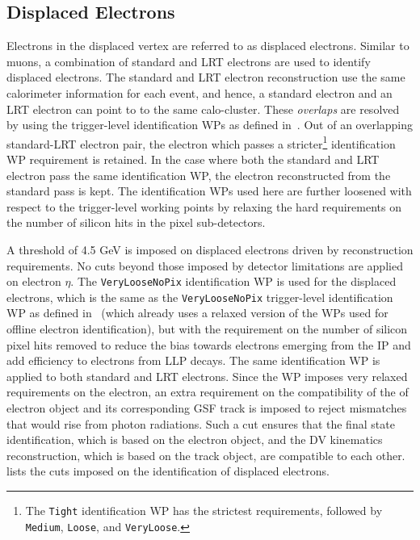 \subsection{Displaced Electrons}
Electrons in the displaced vertex are referred to as displaced electrons. Similar to muons, a combination of standard and LRT electrons are used to identify displaced electrons. The standard and LRT electron reconstruction use the same calorimeter information for each event, and hence, a standard electron and an LRT electron can point to to the same calo-cluster. These \textit{overlaps} are resolved by using the trigger-level identification WPs as defined in~\cite{PERF-2017-01}. Out of an overlapping standard-LRT electron pair, the electron which passes a stricter\footnote{The \texttt{Tight} identification WP has the strictest requirements, followed by \texttt{Medium}, \texttt{Loose}, and \texttt{VeryLoose}.} identification WP requirement is retained. In the case where both the standard and LRT electron pass the same identification WP, the electron reconstructed from the standard pass is kept. The identification WPs used here are further loosened with respect to the trigger-level working points by relaxing the hard requirements on the number of silicon hits in the pixel sub-detectors. 

A \pT threshold of 4.5 GeV is imposed on displaced electrons driven by reconstruction requirements. No cuts beyond those imposed by detector limitations are applied on electron $\eta$. The \texttt{VeryLooseNoPix} identification WP is used for the displaced electrons, which is the same as the \texttt{VeryLooseNoPix} trigger-level identification WP as defined in~\cite{PERF-2017-01} (which already uses a relaxed version of the WPs used for offline electron identification), but with the requirement on the number of silicon pixel hits removed to reduce the bias towards electrons emerging from the IP and add efficiency to electrons from LLP decays. The same identification WP is applied to both standard and LRT electrons. Since the WP imposes very relaxed requirements on the electron, an extra requirement on the compatibility of the \pT of electron object and its corresponding GSF track is imposed to reject mismatches that would rise from photon radiations. Such a cut ensures that the final state identification, which is based on the electron object, and the DV kinematics reconstruction, which is based on the track object, are compatible to each other.~ lists the cuts imposed on the identification of displaced electrons.

